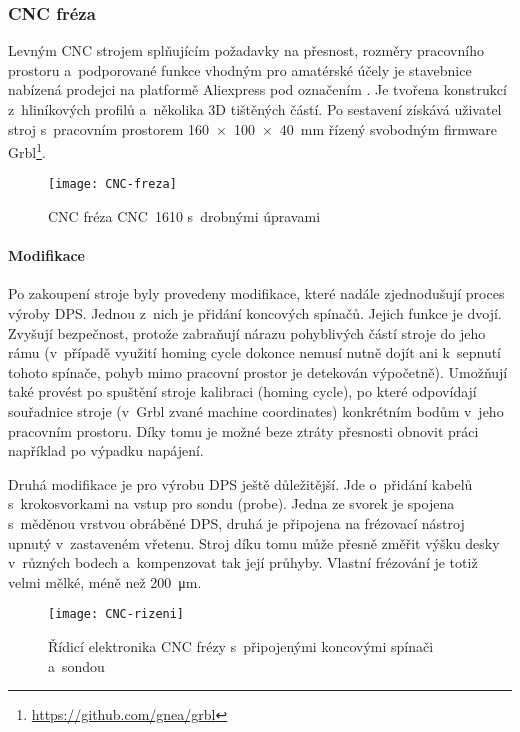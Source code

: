 \subsubsection{CNC fréza}
Levným CNC strojem splňujícím požadavky na přesnost, rozměry pracovního
prostoru a~podporované funkce vhodným pro amatérské účely je stavebnice
nabízená prodejci na platformě Aliexpress pod označením .
Je tvořena konstrukcí z~hliníkových profilů a~několika 3D tištěných částí. Po
sestavení získává uživatel stroj
s~pracovním prostorem \SI{160 x 100 x 40}{\milli\meter} řízený svobodným
firmware Grbl\footnote{\url{https://github.com/gnea/grbl}}.

\begin{figure}[htbp]
    \centering
    \texttt{[image: CNC-freza]}
    \caption{CNC fréza CNC~1610 s~drobnými úpravami}
    \label{fig:CNC freza}
\end{figure}


\paragraph{Modifikace}
Po zakoupení stroje byly provedeny modifikace, které nadále zjednodušují proces
výroby DPS. Jednou z~nich je přidání koncových spínačů. Jejich funkce je dvojí.
Zvyšují bezpečnost, protože zabraňují nárazu pohyblivých částí stroje do jeho
rámu (v~případě využití \foreignlanguage{english}{homing cycle} dokonce nemusí
nutně dojít ani k~sepnutí tohoto spínače, pohyb mimo pracovní prostor je
detekován výpočetně). Umožňují také provést po spuštění stroje kalibraci
(\foreignlanguage{english}{homing cycle}), po které odpovídají souřadnice
stroje (v~Grbl zvané \foreignlanguage{english}{machine coordinates})
konkrétním bodům v~jeho pracovním prostoru. Díky tomu je možné beze ztráty
přesnosti obnovit práci například po výpadku napájení.

Druhá modifikace je pro výrobu DPS ještě důležitější. Jde o~přidání kabelů
s~krokosvorkami na vstup pro sondu (\foreignlanguage{english}{probe}). Jedna ze
svorek je spojena s~měděnou vrstvou obráběné DPS, druhá je připojena na
frézovací nástroj upnutý v~zastaveném vřetenu. Stroj díku tomu může přesně
změřit výšku desky v~různých bodech a~kompenzovat tak její průhyby. Vlastní
frézování je totiž velmi mělké, méně než \SI{200}{\micro\meter}.

\begin{figure}[htbp]
    \centering
    \texttt{[image: CNC-rizeni]}
    \caption{%
        Řídicí elektronika CNC frézy s~připojenými koncovými spínači a~sondou
    }
    \label{fig:CNC rizeni}
\end{figure}

